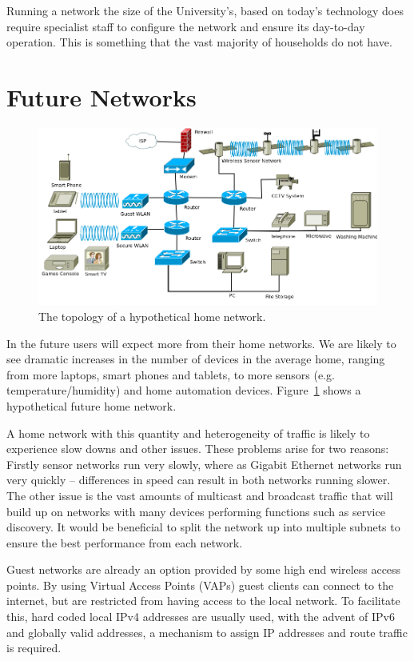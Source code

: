 \documentclass[12pt,a4paper,twoside]{report}
\begin{document}
Running a network the size of the University's, based on today's technology
does require specialist staff to configure the network and ensure its
day-to-day operation. This is something that the vast majority of households do
not have.

\section{Future Networks}
\begin{figure}
\begin{center}
	\includegraphics[width=\linewidth]{../Diagrams/Network/FutureHomenet.png}
	\caption{The topology of a hypothetical home network.}\label{fig:future_net}
\end{center}
\end{figure}
In the future users will expect more from their home networks. We are likely to
see dramatic increases in the number of devices in the average home, ranging
from more laptops, smart phones and tablets, to more sensors (e.g.\@
temperature/humidity) and home automation devices. Figure~\ref{fig:future_net}
shows a hypothetical future home network.

A home network with this quantity and heterogeneity of traffic is likely to
experience slow downs and other issues. These problems arise for two reasons:
Firstly sensor networks run very slowly, where as Gigabit Ethernet networks run
very quickly -- differences in speed can result in both networks running
slower. The other issue is the vast amounts of multicast and broadcast
traffic that will build up on networks with many devices performing functions
such as service discovery. It would be beneficial to split the network up into
multiple subnets to ensure the best performance from each network. 

Guest networks are already an option provided by some high end wireless access
points. By using Virtual Access Points (VAPs)  guest clients can connect to the internet, but are restricted from
having access to the local network. To facilitate this, hard coded local
IPv4 addresses are usually used, with the advent of IPv6 and globally valid
addresses, a mechanism to assign IP addresses and route traffic is required. 
\end{document}
